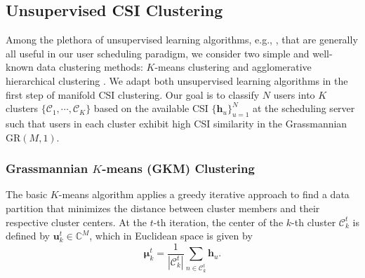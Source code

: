 

\subsection{Unsupervised CSI Clustering} \label{usch:ssec:clustering}

Among the plethora of unsupervised learning algorithms, e.g., \cite{usama19}, that are generally all useful in our user scheduling paradigm, we consider two simple and well-known data clustering methods: $K$-means clustering and agglomerative hierarchical clustering \cite{Xu15}. 
We adapt both unsupervised learning algorithms in the first step of manifold CSI clustering.
Our goal is to classify $N$ users into $K$ clusters $\{\mathcal{C}_1, \cdots, \mathcal{C}_K\}$ based on the available CSI $\{\bm{h}_u\}_{u=1}^N$ at the scheduling server such that users in each cluster exhibit high CSI similarity in the Grassmannian $\mathrm{GR}(M,1)$.


\subsubsection{Grassmannian $K$-means (GKM) Clustering } 
The basic $K$-means algorithm applies a greedy iterative approach to find a data partition that minimizes the distance between cluster members and their respective cluster centers. 
At the $t$-th iteration, the center of the $k$-th cluster $\mathcal{C}_k^t$ is defined by ${\bm{u}}_k^t \in \mathbb{C}^{M}$, which in Euclidean space is given by 
\begin{equation}\label{usch:cen}
	{{\bm{\mu}}_k^t} = \frac{1}{{\left| {{\mathcal{C}_k^t}} \right|}}\sum_{n \in {\mathcal{C}_k^t}} {{{\bm{h}}_{u}} } .
\end{equation}

